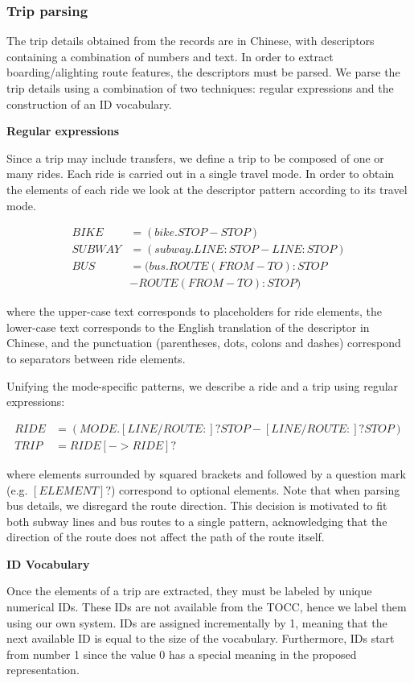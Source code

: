 \documentclass{article}
\begin{document}
\subsubsection{Trip parsing} 
\label{sec:tripParsing}
The trip details obtained from the records are in Chinese, with descriptors containing a combination of numbers and text. In order to extract boarding/alighting route features, the descriptors must be parsed. We parse the trip details using a combination of two techniques: regular expressions and the construction of an ID vocabulary. 

\textbf{Regular expressions}

Since a trip may include transfers, we define a trip to be composed of one or many rides. Each ride is carried out in a single travel mode. In order to obtain the elements of each ride we look at the descriptor pattern according to its travel mode.

    \begin{align*}
    BIKE &= (bike.STOP-STOP) \\
    SUBWAY &= (subway.LINE:STOP-LINE:STOP) \\
    BUS &= (bus.ROUTE(FROM-TO):STOP \\
    &-ROUTE(FROM-TO):STOP)
	\end{align*}
	
where the upper-case text corresponds to placeholders for ride elements, the lower-case text corresponds to the English translation of the descriptor in Chinese, and the punctuation (parentheses, dots, colons and dashes) correspond to separators between ride elements.

Unifying the mode-specific patterns, we describe a ride and a trip using regular expressions:
    
	\begin{align*}	        
    RIDE &= (MODE.[LINE/ROUTE:]?STOP-[LINE/ROUTE:]?STOP) \\
    TRIP &= RIDE[->RIDE]? 
	\end{align*}    
	
where elements surrounded by squared brackets and followed by a question mark (e.g. $[ELEMENT]?$) correspond to optional elements. Note that when parsing bus details, we disregard the route direction. This decision is motivated to fit both subway lines and bus routes to a single pattern, acknowledging that the direction of the route does not affect the path of the route itself.

\textbf{ID Vocabulary}

Once the elements of a trip are extracted, they must be labeled by unique numerical IDs. These IDs are not available from the TOCC, hence we label them using our own system. IDs are assigned incrementally by 1, meaning that the next available ID is equal to the size of the vocabulary. Furthermore, IDs start from number 1 since the value 0 has a special meaning in the proposed representation.
\end{document}
